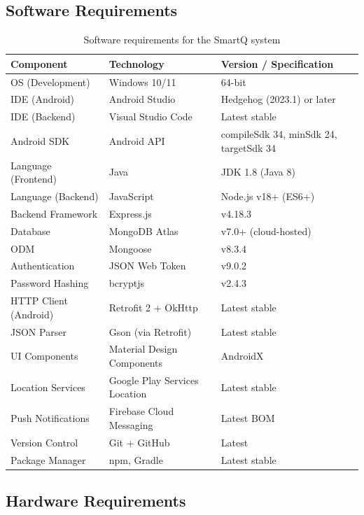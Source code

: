\documentclass[12pt,a4paper]{article}
\begin{document}
\subsection{Software Requirements}

\begin{table}[H]
\centering
\caption{Software requirements for the SmartQ system}
\label{tab:sw-req}
\small
\begin{tabularx}{\textwidth}{l l X}
\toprule
\textbf{Component} & \textbf{Technology} & \textbf{Version / Specification} \\
\midrule
OS (Development) & Windows 10/11 & 64-bit \\
IDE (Android) & Android Studio & Hedgehog (2023.1) or later \\
IDE (Backend) & Visual Studio Code & Latest stable \\
Android SDK & Android API & compileSdk 34, minSdk 24, targetSdk 34 \\
Language (Frontend) & Java & JDK 1.8 (Java 8) \\
Language (Backend) & JavaScript & Node.js v18+ (ES6+) \\
Backend Framework & Express.js & v4.18.3 \\
Database & MongoDB Atlas & v7.0+ (cloud-hosted) \\
ODM & Mongoose & v8.3.4 \\
Authentication & JSON Web Token & v9.0.2 \\
Password Hashing & bcryptjs & v2.4.3 \\
HTTP Client (Android) & Retrofit 2 + OkHttp & Latest stable \\
JSON Parser & Gson (via Retrofit) & Latest stable \\
UI Components & Material Design Components & AndroidX \\
Location Services & Google Play Services Location & Latest stable \\
Push Notifications & Firebase Cloud Messaging & Latest BOM \\
Version Control & Git + GitHub & Latest \\
Package Manager & npm, Gradle & Latest stable \\
\bottomrule
\end{tabularx}
\end{table}

\subsection{Hardware Requirements}
\end{document}
